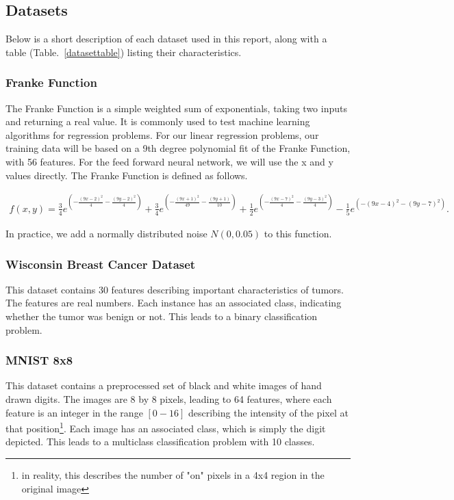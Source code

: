 \documentclass[onecolumn,10pt,cleanfoot]{asme2ej}
\begin{document}
\subsection{Datasets}

Below is a short description of each dataset used in this report, along with a table (Table.~\ref{datasettable}) listing their characteristics.

\subsubsection{Franke Function}

The Franke Function is a simple weighted sum of exponentials, taking two inputs and returning a real value. It is commonly used to test machine learning algorithms for regression problems. For our linear regression problems, our training data will be based on a 9th degree polynomial fit of the Franke Function, with 56 features. For the feed forward neural network, we will use the x and y values directly. The Franke Function is defined as follows.


\begin{multline}
f(x,y) = \frac{3}{4}e^{\left(-\frac{(9x-2)^2}{4}-\frac{(9y-2)^2}{4}\right)} +  \frac{3}{4}e^{\left(-\frac{(9x+1)^2}{49}-\frac{(9y+1)}{10}\right)} +
\frac{1}{2}e^{\left(-\frac{(9x-7)^2}{4}-\frac{(9y-3)^2}{4}\right)} - 
\frac{1}{5}e^{\left(-(9x-4)^2-(9y-7)^2\right)}.
\end{multline}

In practice, we add a normally distributed noise $N(0,0.05)$ to this function.

\subsubsection{Wisconsin Breast Cancer Dataset}

This dataset contains 30 features describing important characteristics of tumors. The features are real numbers. Each instance has an associated class, indicating whether the tumor was benign or not. This leads to a binary classification problem.

\subsubsection{MNIST 8x8}

This dataset contains a preprocessed set of black and white images of hand drawn digits. The images are 8 by 8 pixels, leading to 64 features, where each feature is an integer in the range $[0-16]$ describing the intensity of the pixel at that position\footnote{in reality, this describes the number of "on" pixels in a 4x4 region in the original image}. Each image has an associated class, which is simply the digit depicted. This leads to a multiclass classification problem with 10 classes.
\end{document}
